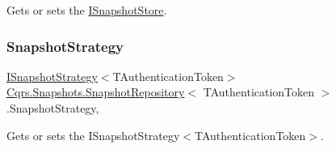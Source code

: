 Gets or sets the \hyperlink{interfaceCqrs_1_1Snapshots_1_1ISnapshotStore}{I\+Snapshot\+Store}. 

\mbox{\label{classCqrs_1_1Snapshots_1_1SnapshotRepository_a7d65b4df10d0b6f75c911a9b6d59b3ba_a7d65b4df10d0b6f75c911a9b6d59b3ba}} 
\subsubsection{\texorpdfstring{Snapshot\+Strategy}{SnapshotStrategy}}
{\footnotesize\ttfamily \hyperlink{interfaceCqrs_1_1Snapshots_1_1ISnapshotStrategy}{I\+Snapshot\+Strategy}$<$T\+Authentication\+Token$>$ \hyperlink{classCqrs_1_1Snapshots_1_1SnapshotRepository}{Cqrs.\+Snapshots.\+Snapshot\+Repository}$<$ T\+Authentication\+Token $>$.Snapshot\+Strategy\hspace{0.3cm}{\ttfamily [get]}, {\ttfamily [protected]}}



Gets or sets the I\+Snapshot\+Strategy$<$\+T\+Authentication\+Token$>$. 

